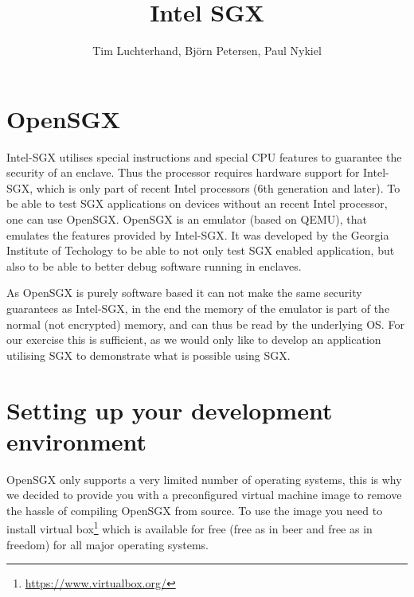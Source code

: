 \documentclass[DIN, pagenumber=false, fontsize=11pt, parskip=half]{scrartcl}
\title{Intel SGX}
\author{Tim Luchterhand, Björn Petersen, Paul Nykiel}
\begin{document}
    \maketitle
    \section{OpenSGX}
    Intel-SGX utilises special instructions and special CPU features to guarantee the security of an enclave.
    Thus the processor requires hardware support for Intel-SGX, which is only part of recent Intel
    processors (6th generation and later). To be able to test SGX applications on devices without an recent
    Intel processor, one can use OpenSGX. OpenSGX is an emulator (based on QEMU), that emulates the features
    provided by Intel-SGX. It was developed by the Georgia Institute of Techology to be able to not only
    test SGX enabled application, but also to be able to better debug software running in enclaves.

    As OpenSGX is purely software based it can not make the same security guarantees as Intel-SGX, in the end
    the memory of the emulator is part of the normal (not encrypted) memory, and can thus be read by the
    underlying OS.
    For our exercise this is sufficient, as we would only like to develop an application utilising SGX to demonstrate
    what is possible using SGX.

    \section{Setting up your development environment}
    OpenSGX only supports a very limited number of operating systems, this is why we decided to provide you with
    a preconfigured virtual machine image to remove the hassle of compiling OpenSGX from source. To use the image
    you need to install virtual box\footnote{\url{https://www.virtualbox.org/}}  which is available for free
    (free as in beer and free as in freedom) for all major operating systems. 
\end{document}
